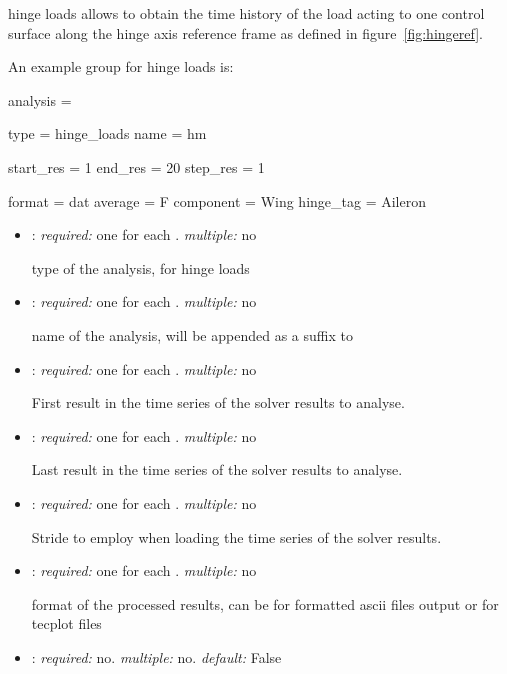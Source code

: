 hinge loads allows to obtain the time history of the load acting to one control 
surface along the hinge axis reference frame as defined in figure~\ref{fig:hingeref}. 

An example  group for hinge loads is:

\begin{inputfile}
analysis = {
  type = hinge_loads
  name = hm

  start_res = 1
  end_res = 20
  step_res = 1

  format = dat
  average = F
  component = Wing
  hinge_tag = Aileron
}
\end{inputfile}

\begin{itemize}
\item {}: \textit{required:} one for each . \textit{multiple:} no

type of the analysis,  for hinge loads

\item {}: \textit{required:} one for each . \textit{multiple:} no

name of the analysis, will be appended as a suffix to 

\item {}: \textit{required:} one for each . \textit{multiple:} no

First result in the time series of the solver results to analyse.

\item {}: \textit{required:} one for each . \textit{multiple:} no

Last result in the time series of the solver results to analyse.

\item {}: \textit{required:} one for each . \textit{multiple:} no

Stride to employ when loading the time series of the solver results. 

\item {}: \textit{required:} one for each . \textit{multiple:} no

format of the processed results, can be  for formatted ascii files output or 
 for tecplot  files

\item {}: \textit{required:} no. \textit{multiple:} no. \textit{default:} False


\end{itemize}
